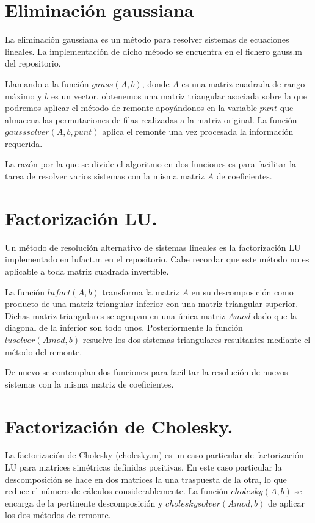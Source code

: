 \documentclass[spanish, a4paper, 12pt] {article}
\begin{document}
\section*{Eliminación gaussiana}
La eliminación gaussiana es un método para resolver sistemas de ecuaciones lineales. La implementación de dicho método se encuentra en el fichero gauss.m del repositorio.\\ \par
Llamando a la función $gauss(A, b)$, donde $A$ es una matriz cuadrada de rango máximo y $b$ es un vector, obtenemos una matriz triangular asociada sobre la que podremos aplicar el método de remonte apoyándonos en la variable $punt$ que almacena las permutaciones de filas realizadas a la matriz original. La función $gausssolver(A, b, punt)$ aplica el remonte una vez procesada la información requerida.\\ \par
La razón por la que se divide el algoritmo en dos funciones es para facilitar la tarea de resolver varios sistemas con la misma matriz $A$ de coeficientes.
\section*{Factorización LU.}
Un método de resolución alternativo de sistemas lineales es la factorización LU implementado en lufact.m en el repositorio. Cabe recordar que este método no es aplicable a toda matriz cuadrada invertible.\\ \par
La función $lufact(A, b)$ transforma la matriz $A$ en su descomposición como producto de una matriz triangular inferior con una matriz triangular superior. Dichas matriz triangulares se agrupan en una única matriz $Amod$ dado que la diagonal de la inferior son todo unos. Posteriormente la función $lusolver(Amod, b)$ resuelve los dos sistemas triangulares resultantes mediante el método del remonte.\\ \par
De nuevo se contemplan dos funciones para facilitar la resolución de nuevos sistemas con la misma matriz de coeficientes.
\section*{Factorización de Cholesky.}
La factorización de Cholesky (cholesky.m) es un caso particular de factorización LU para matrices simétricas definidas positivas. En este caso particular la descomposición se hace en dos matrices la una traspuesta de la otra, lo que reduce el número de cálculos considerablemente. La función $cholesky(A, b)$ se encarga de la pertinente descomposición y $choleskysolver(Amod, b)$ de aplicar los dos métodos de remonte.
\end{document}
